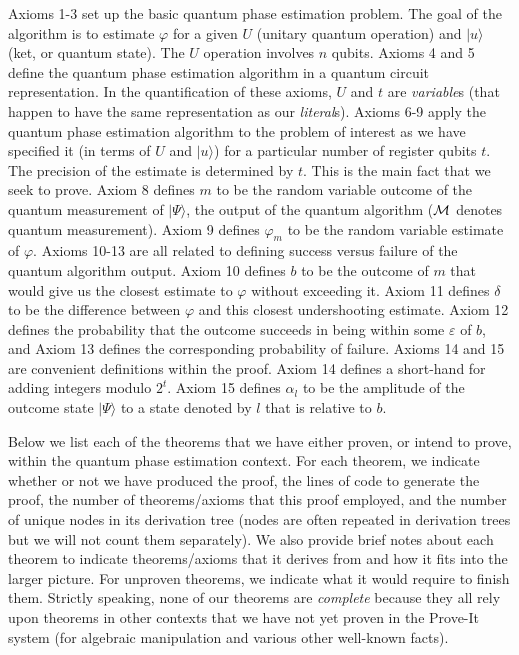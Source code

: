 \documentclass{article}[12pt]
\begin{document}
Axioms 1-3 set up the basic quantum phase estimation problem.  The goal of the algorithm is to estimate $\varphi$ for a given $U$ (unitary quantum operation) and $\lvert u \rangle$ (ket, or quantum state).  The $U$ operation involves $n$ qubits.  Axioms 4 and 5 define the quantum phase estimation algorithm in a quantum circuit representation.  In the quantification of these axioms, $U$ and $t$ are {\em variable}s (that happen to have the same representation as our {\em literal}s).  Axioms 6-9 apply the quantum phase estimation algorithm to the problem of interest as we have specified it (in terms of $U$ and $\lvert u \rangle$) for a particular number of register qubits $t$.  The precision of the estimate is determined by $t$.  This is the main fact that we seek to prove.  Axiom 8 defines $m$ to be the random variable outcome of the quantum measurement of $\lvert \Psi \rangle$, the output of the quantum algorithm (${\cal M}$ denotes quantum measurement).  Axiom 9 defines $\varphi_m$ to be the random variable estimate of $\varphi$.  Axioms 10-13 are all related to defining success versus failure of the quantum algorithm output.  Axiom 10 defines $b$ to be the outcome of $m$ that would give us the closest estimate to $\varphi$ without exceeding it.  Axiom 11 defines $\delta$ to be the difference between $\varphi$ and this closest undershooting estimate.  Axiom 12 defines the probability that the outcome succeeds in being within some $\varepsilon$ of $b$, and Axiom 13 defines the corresponding probability of failure.  Axioms 14 and 15 are convenient definitions within the proof.  Axiom 14 defines a short-hand for adding integers modulo $2^t$.  Axiom 15 defines $\alpha_l$ to be the amplitude of the outcome state $\vert \Psi \rangle$ to a state denoted by $l$ that is relative to $b$.

Below we list each of the theorems that we have either proven, or intend to prove, within the quantum phase estimation context.  For each theorem, we indicate whether or not we have produced the proof, the lines of code to generate the proof, the number of theorems/axioms that this proof employed, and the number of unique nodes in its derivation tree (nodes are often repeated in derivation trees but we will not count them separately).  We also provide brief notes about each theorem to indicate theorems/axioms that it derives from and how it fits into the larger picture.  For unproven theorems, we indicate what it would require to finish them.  Strictly speaking, none of our theorems are {\em complete} because they all rely upon theorems in other contexts that we have not yet proven in the Prove-It system (for algebraic manipulation and various other well-known facts).
\end{document}
